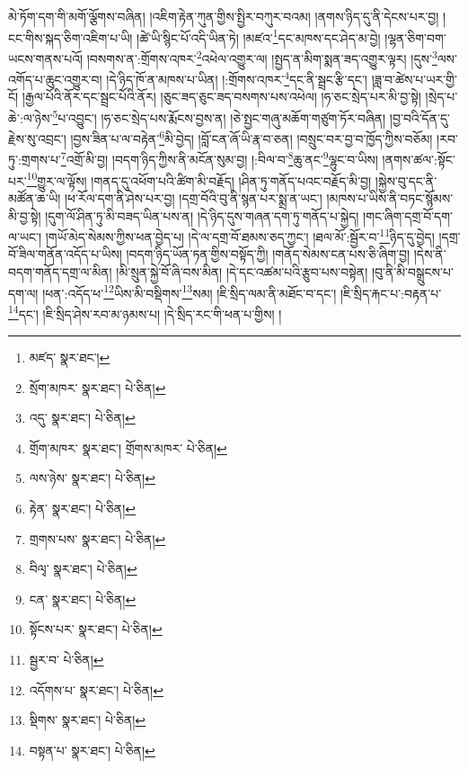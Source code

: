 མེ་ཏོག་དག་གི་མགོ་ལྕོགས་བཞིན། །འཇིག་རྟེན་ཀུན་གྱིས་སྤྱིར་བཀུར་བའམ། །ནགས་ཉིད་དུ་ནི་དེངས་པར་བྱ། །ངང་གིས་སྐད་ཅིག་འཇིག་པ་ཡི། །ཚེ་ཡི་སྙིང་པོ་འདི་ཡིན་ཏེ། །མཛའ་\footnote{མཛད་  སྣར་ཐང་། }དང་མཁས་དང་ཤེད་མ་བྱེ། །ལྷན་ཅིག་བག་ཡངས་གནས་པའོ། །བསགས་ན་:གྲོགས་འཁར་\footnote{སྲོག་མཁར་  སྣར་ཐང་།  པེ་ཅིན། }འཕེལ་འགྱུར་ལ། །སྤྱད་ན་མིག་སྨན་ཟད་འགྱུར་ལྟར། །དུས་\footnote{འདུ་  སྣར་ཐང་།  པེ་ཅིན། }ལས་འགོད་པ་ཆུང་འགྱུར་བ། །དེ་ཉིད་ཁོ་ན་མཁས་པ་ཡིན། །:གྲོགས་འཁར་\footnote{གྲོག་མཁར་  སྣར་ཐང་། གྲོགས་མཁར་  པེ་ཅིན། }དང་ནི་སྦྲང་རྩི་དང་། །ཟླ་བ་ཚེས་པ་ཡར་གྱི་ངོ། །རྒྱལ་པོའི་ནོར་དང་སྦྲང་པོའི་ནོར། །ཅུང་ཟད་ཅུང་ཟད་བསགས་པས་འཕེལ། །ཧ་ཅང་སྲེད་པར་མི་བྱ་སྟེ། །སྲེད་པ་ཆེ་:ལ་ཉེས་\footnote{ལས་ཉེས་  སྣར་ཐང་།  པེ་ཅིན། }པ་འབྱུང་། །ཧ་ཅང་སྲེད་པས་རྨོངས་བྱས་ན། །ཅེ་སྤྱང་གཞུ་མཆོག་གཙུག་ཏོར་བཞིན། །བྱ་བའི་དོན་དུ་རྗེས་སུ་འབྲང་། །བྱས་ཟིན་པ་ལ་བརྟེན་\footnote{རྟེན་  སྣར་ཐང་།  པེ་ཅིན། }མི་བྱེད། །བློ་ངན་ཞོ་ཡི་རྣ་བ་ཅན། །བསྲུང་བར་བྱ་བ་ཁྱོད་ཀྱིས་བཅོམ། །རབ་ཏུ་:གྲགས་པ་\footnote{གྲགས་པས་  སྣར་ཐང་།  པེ་ཅིན། }འགྲོ་མི་བྱ། །བདག་ཉིད་ཀྱིས་ནི་མངོན་སུམ་བྱ། །:བིལ་བ་\footnote{བིལྭ་  སྣར་ཐང་།  པེ་ཅིན། }ཆུ་ནང་\footnote{ངན་  སྣར་ཐང་།  པེ་ཅིན། }ལྷུང་བ་ཡིས། །ནགས་ཚལ་:སྟོང་པར་\footnote{སྟོངས་པར་  སྣར་ཐང་།  པེ་ཅིན། }གྱུར་ལ་ལྟོས། །གནད་དུ་འཕོག་པའི་ཚིག་མི་བརྗོད། །ཤིན་ཏུ་གནོད་པའང་བརྗོད་མི་བྱ། །སྐྱེས་བུ་དང་ནི་མཚོན་ཆ་ཡི། །ཕ་རོལ་དག་ནི་ཤེས་པར་བྱ། །དགྲ་བོའི་བུ་ནི་སྙན་པར་སྨྲ་ན་ཡང་། །མཁས་པ་ཡིས་ནི་བཏང་སྙོམས་མི་བྱ་སྟེ། །དུག་ལོ་ཤིན་ཏུ་མི་བཟད་ཡིན་པས་ན། །དེ་ཉིད་དུས་གཞན་དག་ཏུ་གནོད་པ་སྐྱེད། །གང་ཞིག་དགྲ་བོ་དག་ལ་ཡང་། །གཡོ་མེད་སེམས་ཀྱིས་ཕན་བྱེད་པ། །དེ་ལ་དགྲ་བོ་ཐམས་ཅད་ཀྱང་། །ཐལ་མོ་:སྦྱོར་བ་\footnote{སྦྱར་བ་  པེ་ཅིན། }ཉིད་དུ་བྱེད། །དགྲ་བོ་ཟིལ་གནོན་འདོད་པ་ཡིས། །བདག་ཉིད་ཡོན་ཏན་གྱིས་བསྟོད་ཀྱི། །གནོད་སེམས་ངན་པས་ཅི་ཞིག་བྱ། །དེས་ནི་བདག་གནོད་དགྲ་ལ་མིན། །མི་སྲུན་སྐྱེ་བོ་ཞི་བས་མིན། །དེ་དང་འཚམ་པའི་རྩུབ་པས་བསྟེན། །བུ་ནི་མི་བསྒྲུངས་པ་དག་ལ། །ཕན་:འདོད་ཕ་\footnote{འདོགས་པ་  སྣར་ཐང་།  པེ་ཅིན། }ཡིས་མི་བསྡིགས་\footnote{སྡིགས་  སྣར་ཐང་།  པེ་ཅིན། }སམ། །ཇི་སྲིད་ལམ་ནི་མཐོང་བ་དང་། །ཇི་སྲིད་རྐང་པ་:བརྟན་པ་\footnote{བསྟན་པ་  སྣར་ཐང་།  པེ་ཅིན། }དང་། །ཇི་སྲིད་ཤེས་རབ་མ་ཉམས་པ། །དེ་སྲིད་རང་གི་ཕན་པ་གྱིས། །
